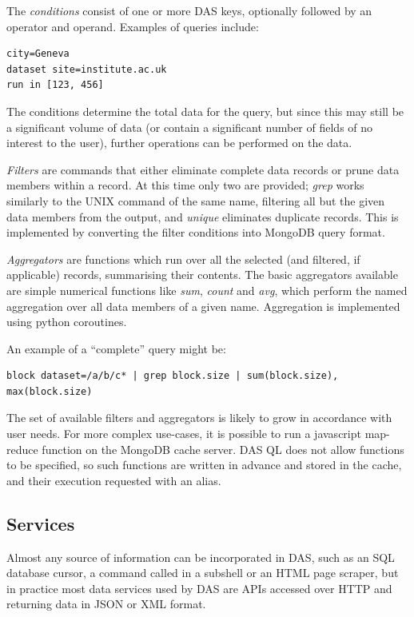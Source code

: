 \documentclass[a4paper]{jpconf}
\begin{document}
The \emph{conditions} consist of one or more DAS keys, optionally followed by an operator and operand. Examples of queries include:

\begin{verbatim}
city=Geneva
dataset site=institute.ac.uk
run in [123, 456]
\end{verbatim}

The conditions determine the total data for the query, but since this may still be a significant volume of data (or contain a significant number of fields of no interest to the user), further operations can be performed on the data.

\emph{Filters} are commands that either eliminate complete data records or prune data members within a record. At this time only two are provided; \emph{grep} works similarly to the UNIX command of the same name, filtering all but the given data members from the output, and \emph{unique} eliminates duplicate records. This is implemented by converting the filter conditions into MongoDB query format.

\emph{Aggregators} are functions which run over all the selected (and filtered, if applicable) records, summarising their contents. The basic aggregators available are simple numerical functions like \emph{sum}, \emph{count} and \emph{avg}, which perform the named aggregation over all data members of a given name. Aggregation is implemented using python coroutines.

An example of a ``complete'' query might be:

\begin{verbatim}
block dataset=/a/b/c* | grep block.size | sum(block.size), max(block.size)
\end{verbatim}

The set of available filters and aggregators is likely to grow in accordance with user needs. For more complex use-cases, it is possible to run a javascript map-reduce function on the MongoDB cache server. DAS QL does not allow functions to be specified, so such functions are written in advance and stored in the cache, and their execution requested with an alias.

\subsection{\label{services}Services}

Almost any source of information can be incorporated in DAS, such as an SQL database cursor, a command called in a subshell or an HTML page scraper, but in practice most data services used by DAS are APIs accessed over HTTP and returning data in JSON or XML format.
\end{document}
